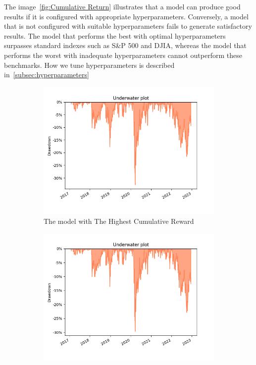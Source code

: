 \documentclass[../xlapes02]{subfiles}
\begin{document}
    The image~\cref{fig:Cumulative Return} illustrates that a model can produce good results if it is configured with appropriate hyperparameters. Conversely, a model that is not configured with suitable hyperparameters fails to generate satisfactory results. The model that performs the best with optimal hyperparameters surpasses standard indexes such as S\&P 500 and DJIA, whereas the model that performs the worst with inadequate hyperparameters cannot outperform these benchmarks. How we tune hyperparameters is described in~\cref{subsec:hyperparameters}

    \begin{figure}[h!]
        \centering
        \begin{subfigure}[t]{0.3\textwidth}
            \centering
            \includegraphics[width=\linewidth]{image/figure/drawdown_underwater_max}
            \caption{The model with The Highest Cumulative Reward}
            \label{fig:drawdown_underwater_max}
        \end{subfigure}
        \hfill
        \begin{subfigure}[t]{0.3\textwidth}
            \centering
            \includegraphics[width=\linewidth]{image/figure/drawdown_underwater_min}

\end{subfigure}
\end{figure}
\end{document}
